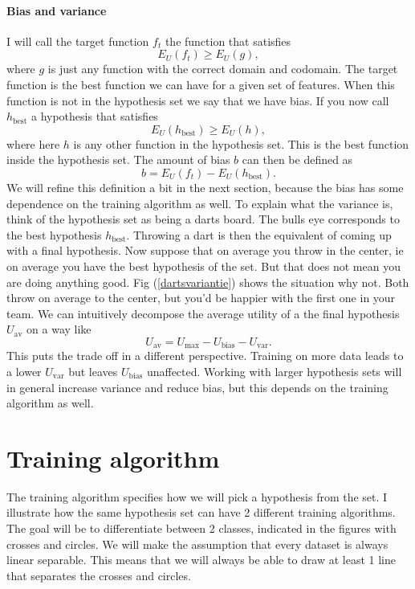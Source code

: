 \documentclass{report}
\theoremstyle{definition}
\begin{document}
\paragraph{Bias and variance}
I will call the target function $f_t$ the function that satisfies
\begin{equation}
E_{U}(f_t) \geq E_{U}(g),
\end{equation}
where $g$ is just any function with the correct domain and codomain. The target function is the best function we can have for a given set of features. When this function is not in the hypothesis set we say that we have bias. If you now call $h_{\text{best}}$ a hypothesis that satisfies
\begin{equation}
E_{U}(h_{\text{best}}) \geq E_{U}(h),
\end{equation}
where here $h$ is any other function in the hypothesis set. This is the best function inside the hypothesis set. The amount of bias $b$ can then be defined as
\begin{equation}
b = E_{U}(f_t) - E_{U}(h_{\text{best}}).
\end{equation}
We will refine this definition a bit in the next section, because the bias has some dependence on the training algorithm as well. To explain what the variance is, think of the hypothesis set as being a darts board. The bulls eye corresponds to the best hypothesis $h_{\text{best}}$. Throwing a dart is then the equivalent of coming up with a final hypothesis. Now suppose that on average you throw in the center, ie on average you have the best hypothesis of the set. But that does not mean you are doing anything good. Fig (\ref{dartsvariantie}) shows the situation why not. Both throw on average to the center, but you'd be happier with the first one in your team.
We can intuitively decompose the average utility of a the final hypothesis $U_{\text{av}}$ on a way like
\begin{equation}
U_{\text{av}} = U_{\text{max}} - U_{\text{bias}} - U_{\text{var}}.
\end{equation}
This puts the trade off in a different perspective. Training on more data leads to a lower $U_{\text{var}}$ but leaves $U_{\text{bias}}$ unaffected. Working with larger hypothesis sets will in general increase variance and reduce bias, but this depends on the training algorithm as well.  
	\section{Training algorithm}
The training algorithm specifies how we will pick a hypothesis from the set. I illustrate how the same hypothesis set can have 2 different training algorithms. The goal will be to differentiate between 2 classes, indicated in the figures with crosses and circles. We will make the assumption that every dataset is always linear separable. This means that we will always be able to draw at least 1 line that separates the crosses and circles.
\end{document}
